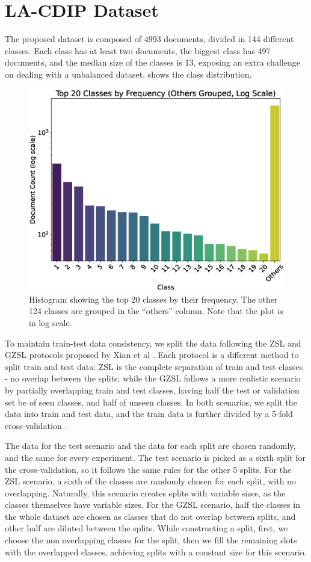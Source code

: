 \section{LA-CDIP Dataset}
\label{sec:dataset}

The proposed dataset is composed of 4993 documents, divided in 144 different classes. Each class has at least two documents, the biggest class has 497 documents, and the median size of the classes is 13, exposing an extra challenge on dealing with a unbalanced dataset.  shows the class distribution.

\begin{figure}[htbp]
\centering
\includegraphics[width=.8\textwidth]{images/hist2.eps}
\caption{Histogram showing the top 20 classes by their frequency. The other 124 classes are grouped in the ``others'' column. Note that the plot is in log scale.}
\label{fig:histplot}
\end{figure}  

To maintain train-test data consistency, we split the data following the \gls{ZSL} and \gls{GZSL} protocols proposed by Xian et al \cite{gzsl}. Each protocol is a different method to split train and test data: \gls{ZSL} is the complete separation of train and test classes - no overlap between the splits; while the \gls{GZSL} follows a more realistic scenario by partially overlapping train and test classes, having half the test or validation set be of seen classes, and half of unseen classes. In both scenarios, we split the data into train and test data, and the train data is further divided by a 5-fold cross-validation \cite{kfoldcv}.

The data for the test scenario and the data for each split are chosen randomly, and the same for every experiment. The test scenario is picked as a sixth split for the cross-validation, so it follows the same rules for the other 5 splits. For the \gls{ZSL} scenario, a sixth of the classes are randomly chosen for each split, with no overlapping. Naturally, this scenario creates splits with variable sizes, as the classes themselves have variable sizes. For the \gls{GZSL} scenario, half the classes in the whole dataset are chosen as classes that do not overlap between splits, and other half are diluted between the splits. While constructing a split, first, we choose the non overlapping classes for the split, then we fill the remaining slots with the overlapped classes, achieving splits with a constant size for this scenario.

